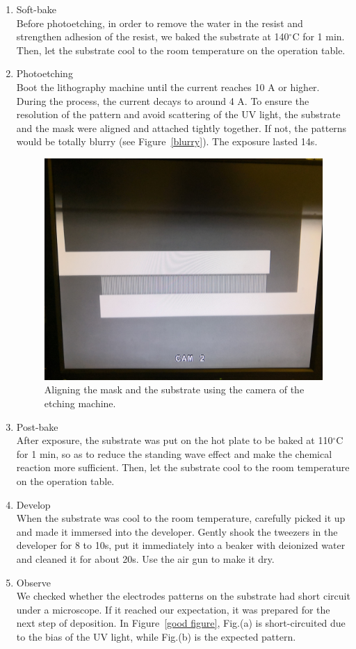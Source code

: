 \documentclass[journal,svgnames,twocolumn,x11names]{IEEEtran}
\begin{document}
\begin{enumerate}
\begin{enumerate}
            \item Soft-bake\\
                Before photoetching, in order to remove the water in the resist and strengthen adhesion of the resist, we baked the substrate at 140$^{\circ}$C for 1 min. Then, let the substrate cool to the room temperature on the operation table.
            \item Photoetching\\
                Boot the lithography machine until the current reaches 10 A or higher. During the process, the current decays to around 4 A. To ensure the resolution of the pattern and avoid scattering of the UV light, the substrate and the mask were aligned and attached tightly together. If not, the patterns would be totally blurry (see Figure~\ref{blurry}). The exposure lasted 14s.
            \begin{figure}[H]
                \centering
                \includegraphics[width=0.5\linewidth]{EM_camera.jpg}
                \caption{Aligning the mask and the substrate using the camera of the etching machine.}
                \label{fig:EM_camera}
            \end{figure}
            \item Post-bake\\
                After exposure, the substrate was put on the hot plate to be baked at 110$^{\circ}$C for 1 min, so as to reduce the standing wave effect and make the chemical reaction more sufficient. Then, let the substrate cool to the room temperature on the operation table.
            \item Develop\\
                When the substrate was cool to the room temperature, carefully picked it up and made it immersed into the developer. Gently shook the tweezers in the developer for 8 to 10s, put it immediately into a beaker with deionized water and cleaned it for about 20s. Use the air gun to make it dry.  
            \item Observe\\
                We checked whether the electrodes patterns on the substrate had short circuit under a microscope. If it reached our expectation, it was prepared for the next step of deposition.
                In Figure~\ref{good figure}, Fig.(a) is short-circuited due to the bias of the UV light, while Fig.(b) is the expected pattern.
        \end{enumerate}
        

\end{enumerate}
\end{document}
